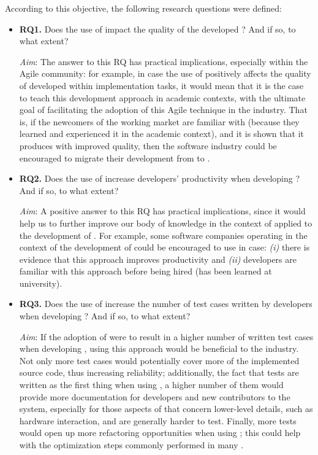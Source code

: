 \noindent According to this objective, the following research questions were defined:
\begin{itemize}
    \item \textbf{RQ1.} Does the use of \tdd impact the quality of the developed \es? And if so, to what extent?

    \noindent\textit{Aim}: The answer to this RQ has practical implications, especially within the Agile community: for example, in case the use of \tdd positively affects the quality of \ess developed within implementation tasks, it would mean that it is the case to teach this development approach in academic contexts, with the ultimate goal of facilitating the adoption of this Agile technique in the industry. 
    That is, if the newcomers of the working market are familiar with \tdd (because they learned and experienced it in the academic context), and it is shown that it produces \ess with improved quality, then the software industry could be encouraged to migrate their development from \notdd to \tdd.

    \item \textbf{RQ2.} Does the use of \tdd increase developers' productivity when developing \ess? And if so, to what extent?

    \noindent\textit{Aim}: A positive answer to this RQ has practical implications, since it would help us to further improve our body of knowledge in the context of \tdd applied to the development of \ess. For example, some software companies operating in the context of the development of \ess could be encouraged to use \tdd in case: \textit{(i)} there is evidence that this approach improves productivity and \textit{(ii)} developers are familiar with this approach before being hired (\eg \tdd has been learned at university).

    \item \textbf{RQ3.} Does the use of \tdd increase the number of test cases written by developers when developing \ess? And if so, to what extent?

    \noindent\textit{Aim}: If the adoption of \tdd were to result in a higher number of written test cases when developing \ess, using this approach would be beneficial to the industry. Not only more test cases would potentially cover more of the implemented source code, thus increasing reliability; additionally, the fact that tests are written as the first thing when using \tdd, a higher number of them would provide more documentation for developers and new contributors to the system, especially for those aspects of \ess that concern lower-level details, such as hardware interaction, and are generally harder to test. Finally, more tests would open up more refactoring opportunities when using \tdd; this could help with the optimization steps commonly performed in many \ess.
\end{itemize}




